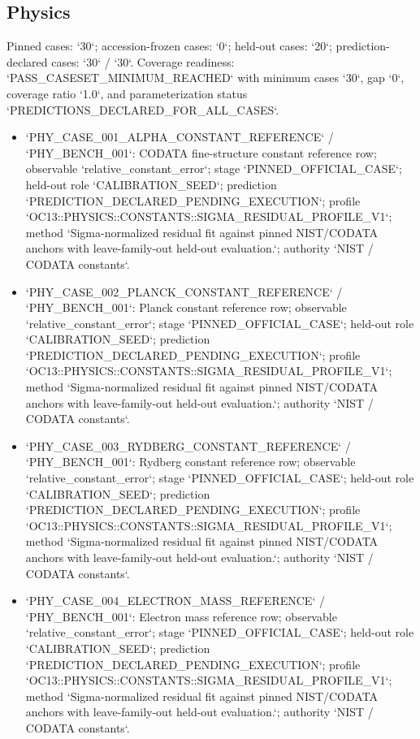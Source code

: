 \subsection{Physics}
Pinned cases: `30`; accession-frozen cases: `0`; held-out cases: `20`; prediction-declared cases: `30` / `30`.
Coverage readiness: `PASS\_CASESET\_MINIMUM\_REACHED` with minimum cases `30`, gap `0`, coverage ratio `1.0`, and parameterization status `PREDICTIONS\_DECLARED\_FOR\_ALL\_CASES`.
\begin{itemize}
\item `PHY\_CASE\_001\_ALPHA\_CONSTANT\_REFERENCE` / `PHY\_BENCH\_001`: CODATA fine-structure constant reference row; observable `relative\_constant\_error`; stage `PINNED\_OFFICIAL\_CASE`; held-out role `CALIBRATION\_SEED`; prediction `PREDICTION\_DECLARED\_PENDING\_EXECUTION`; profile `OC13::PHYSICS::CONSTANTS::SIGMA\_RESIDUAL\_PROFILE\_V1`; method `Sigma-normalized residual fit against pinned NIST/CODATA anchors with leave-family-out held-out evaluation.`; authority `NIST / CODATA constants`.
\item `PHY\_CASE\_002\_PLANCK\_CONSTANT\_REFERENCE` / `PHY\_BENCH\_001`: Planck constant reference row; observable `relative\_constant\_error`; stage `PINNED\_OFFICIAL\_CASE`; held-out role `CALIBRATION\_SEED`; prediction `PREDICTION\_DECLARED\_PENDING\_EXECUTION`; profile `OC13::PHYSICS::CONSTANTS::SIGMA\_RESIDUAL\_PROFILE\_V1`; method `Sigma-normalized residual fit against pinned NIST/CODATA anchors with leave-family-out held-out evaluation.`; authority `NIST / CODATA constants`.
\item `PHY\_CASE\_003\_RYDBERG\_CONSTANT\_REFERENCE` / `PHY\_BENCH\_001`: Rydberg constant reference row; observable `relative\_constant\_error`; stage `PINNED\_OFFICIAL\_CASE`; held-out role `CALIBRATION\_SEED`; prediction `PREDICTION\_DECLARED\_PENDING\_EXECUTION`; profile `OC13::PHYSICS::CONSTANTS::SIGMA\_RESIDUAL\_PROFILE\_V1`; method `Sigma-normalized residual fit against pinned NIST/CODATA anchors with leave-family-out held-out evaluation.`; authority `NIST / CODATA constants`.
\item `PHY\_CASE\_004\_ELECTRON\_MASS\_REFERENCE` / `PHY\_BENCH\_001`: Electron mass reference row; observable `relative\_constant\_error`; stage `PINNED\_OFFICIAL\_CASE`; held-out role `CALIBRATION\_SEED`; prediction `PREDICTION\_DECLARED\_PENDING\_EXECUTION`; profile `OC13::PHYSICS::CONSTANTS::SIGMA\_RESIDUAL\_PROFILE\_V1`; method `Sigma-normalized residual fit against pinned NIST/CODATA anchors with leave-family-out held-out evaluation.`; authority `NIST / CODATA constants`.

\end{itemize}
